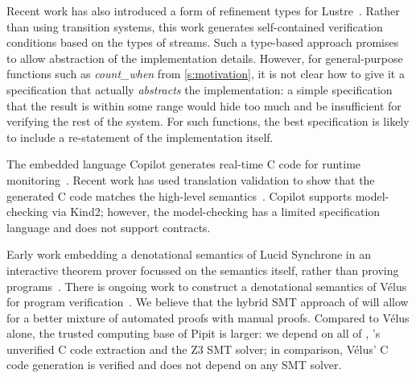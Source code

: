 Recent work has also introduced a form of refinement types for Lustre~\cite{chen2022synchronous}.
Rather than using transition systems, this work generates self-contained verification conditions based on the types of streams.
Such a type-based approach promises to allow abstraction of the implementation details.
However, for general-purpose functions such as \emph{count_when} from \autoref{s:motivation}, it is not clear how to give it a specification that actually \emph{abstracts} the implementation: a simple specification that the result is within some range would hide too much and be insufficient for verifying the rest of the system.
For such functions, the best specification is likely to include a re-statement of the implementation itself.

The embedded language Copilot generates real-time C code for runtime monitoring~\cite{laurent2015assuring}.
Recent work has used translation validation to show that the generated C code matches the high-level semantics~\cite{scott2023trustworthy}.
Copilot supports model-checking via Kind2; however, the model-checking has a limited specification language and does not support contracts.

Early work embedding a denotational semantics of Lucid Synchrone in an interactive theorem prover focussed on the semantics itself, rather than proving programs~\cite{boulme2001clocked}.
There is ongoing work to construct a denotational semantics of Vélus for program verification~\cite{bourke2022towards}.
We believe that the hybrid SMT approach of \fstar{} will allow for a better mixture of automated proofs with manual proofs.
Compared to Vélus alone, the trusted computing base of Pipit is larger: we depend on all of \fstar{}, \lowstar{}'s unverified C code extraction and the Z3 SMT solver; in comparison, Vélus' C code generation is verified and does not depend on any SMT solver.




